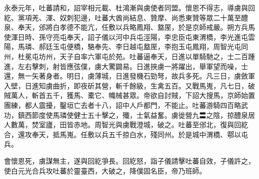 \begin{pinyinscope}
 永泰元年，吐蕃請和，詔宰相元載、杜鴻漸與虜使者同盟。懷恩不得志，導虜與回紇、黨項羌、渾、奴刺犯邊，吐蕃大酋尚結息、贊摩、尚悉東贊等眾二十萬至醴泉、奉天，邠將白孝德不能亢，任敷以兵略鳳翔、盩厔，於是京師戒嚴。朔方兵馬使渾日時、孫守亮屯奉天，詔子儀以河中兵屯涇陽，李忠臣屯東渭橋，李光進屯雲陽，馬璘、郝廷玉屯便橋，駱奉先、李日越屯盩厔，李抱玉屯鳳翔，周智光屯同州，杜冕屯坊州，天子自率六軍屯於苑。吐蕃逼奉天，日進以單騎馳之，士二百踵進，左右擊刺，射皆應弦僕，虜大驚闢易。日進挾虜一將躍出，舉軍望而噪，士還，無一矢著身者。明日，虜薄城，日進發機石勁弩，故兵多死。凡三日，虜斂軍入壁，日進知虜曲折，即夜斫其營，斬千餘級，生禽五百。又戰馬嵬，凡七日，破賊萬人，斬首五千，獲馬、橐它、幟械甚眾。帝欲自討賊，下詔大搜馬，京師始置團練，都人震擾，鑿垣亡去者十八，詔中人戶都門，不能止。吐蕃游騎四百略武功，鎮西節度使馬璘使健士五十擊之，殲，士氣益奮。虜徙營九〓之陰，掠醴泉居人數萬，焚室廬，田皆赤地。周智光與虜戰澄城，破之。吐蕃至邠北，復與回紇合，還攻奉天，抵馬嵬。任敷以兵五千掠白水，殘同州。於是城中渭橋、鄠以屯兵。



 會懷恩死，虜謀無主，遂與回紇爭長。回紇怒，詣子儀請擊吐蕃自效，子儀許之，使白元光合兵攻吐蕃於靈臺西，大破之，降僕固名臣，帝乃班師。



\end{pinyinscope}